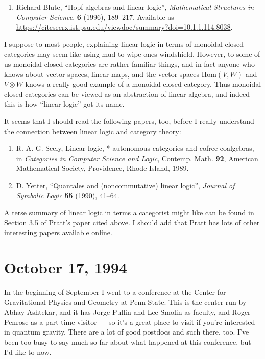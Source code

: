 \documentclass{article}
\def\tightlist{}
\begin{document}
\begin{enumerate}
\def\labelenumi{\arabic{enumi})}
\setcounter{enumi}{2}
\tightlist
\item
  Richard Blute, ``Hopf algebras and linear logic'', 
  \emph{Mathematical Structures in Computer Science}, \textbf{6} (1996), 189--217.
  Available as \href{https://citeseerx.ist.psu.edu/viewdoc/summary?doi=10.1.1.114.8038}{https://citeseerx.ist.psu.edu/viewdoc/summary?doi=10.1.1.114.8038}.
\end{enumerate}
\noindent
I suppose to most people, explaining linear logic in terms of monoidal
closed categories may seem like using mud to wipe ones windshield.
However, to some of us monoidal closed categories are rather familiar
things, and in fact anyone who knows about vector spaces, linear maps,
and the vector spaces \(\mathrm{Hom}(V,W)\) and \(V\otimes W\) knows a
really good example of a monoidal closed category. Thus monoidal closed
categories can be viewed as an abstraction of linear algebra, and indeed
this is how ``linear logic'' got its name.

It seems that I should read the following papers, too, before I really
understand the connection between linear logic and category theory:

\begin{enumerate}
\def\labelenumi{\arabic{enumi})}
\setcounter{enumi}{3}
\item
  R. A. G. Seely, Linear logic, *-autonomous categories and cofree coalgebras, in \emph{Categories in Computer Science and Logic}, Contemp.
  Math. \textbf{92}, American Mathematical Society, Providence, Rhode Island, 1989.
\item
  D. Yetter, ``Quantales and (noncommutative) linear logic'',
  \emph{Journal of Symbolic Logic} \textbf{55} (1990), 41--64.
\end{enumerate}
\noindent
A terse summary of linear logic in terms a categorist might like can be
found in Section 3.5 of Pratt's paper cited above. I should add that
Pratt has lots of other interesting papers available online.



\hypertarget{week41}{%
\section{October 17, 1994}\label{week41}}

In the beginning of September I went to a conference at the Center for
Gravitational Physics and Geometry at Penn State. This is the center run
by Abhay Ashtekar, and it has Jorge Pullin and Lee Smolin as faculty,
and Roger Penrose as a part-time visitor --- so it's a great place to
visit if you're interested in quantum gravity. There are a lot of good
postdocs and such there, too. I've been too busy to say much so far
about what happened at this conference, but I'd like to now.
\end{document}
